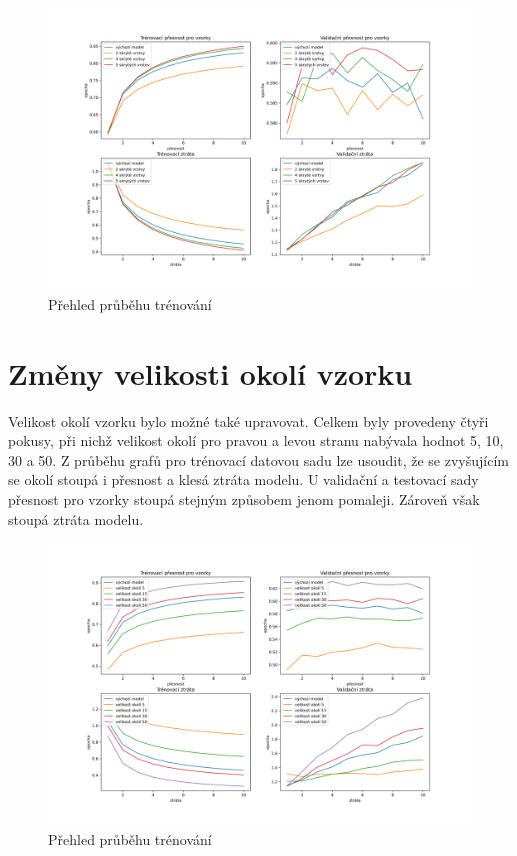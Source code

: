 \documentclass[FM,BP]{tulthesis}
\begin{document}
\begin{figure}[!htbp]
\centerline{\includegraphics[scale=.5]{training_course-layers.png}}
\caption{Přehled průběhu trénování}
\label{fig}
\end{figure}
\FloatBarrier

\section{Změny velikosti okolí vzorku} %
Velikost okolí vzorku bylo možné také upravovat. Celkem byly provedeny čtyři pokusy, při nichž velikost okolí pro pravou a levou stranu nabývala hodnot 5, 10, 30 a 50. Z průběhu grafů pro trénovací datovou sadu lze usoudit, že se zvyšujícím se okolí stoupá i přesnost a klesá ztráta modelu. U validační a testovací sady přesnost pro vzorky stoupá stejným způsobem jenom pomaleji. Zároveň však stoupá ztráta modelu.

\begin{figure}[!htbp]
\centerline{\includegraphics[scale=.5]{training_course-margin.png}}
\caption{Přehled průběhu trénování}
\label{fig}
\end{figure}
\FloatBarrier
\end{document}

